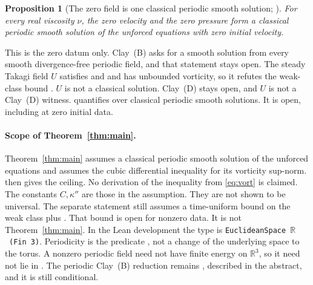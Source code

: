 \documentclass[11pt,a4paper]{article}
\theoremstyle{plain}
\newtheorem{proposition}{Proposition}[section]
\theoremstyle{definition}
\theoremstyle{remark}
\begin{document}
\begin{proposition}[The zero field is one classical periodic smooth solution; ]\label{prop:classical-zero}
For every real viscosity $\nu$, the zero velocity and the zero pressure form a classical periodic smooth solution of the unforced equations with zero initial velocity.
\end{proposition}
This is the zero datum only. Clay~(B) asks for a smooth solution from every smooth divergence-free periodic field, and that statement stays open. The steady Takagi field $U$ satisfies  and  and has unbounded vorticity, so it refutes the weak-class bound . $U$ is not a classical solution. Clay~(D) stays open, and $U$ is not a Clay~(D) witness.  quantifies over classical periodic smooth solutions. It is open, including at zero initial data.

\paragraph{Scope of Theorem~\ref{thm:main}.} Theorem~\ref{thm:main} assumes a classical periodic smooth solution of the unforced equations and assumes the cubic differential inequality for its vorticity sup-norm.  then gives the ceiling. No derivation of the inequality from \eqref{eq:vort} is claimed. The constants $C,\kappa''$ are those in the assumption. They are not shown to be universal. The separate statement  still assumes a time-uniform bound on the weak class  plus . That bound is open for nonzero data. It is not Theorem~\ref{thm:main}. In the Lean development the type  is \texttt{EuclideanSpace}~$\mathbb{R}$~\texttt{(Fin 3)}. Periodicity is the predicate , not a change of the underlying space to the torus. A nonzero periodic field need not have finite energy on $\mathbb{R}^3$, so it need not lie in . The periodic Clay~(B) reduction remains , described in the abstract, and it is still conditional.
\end{document}
